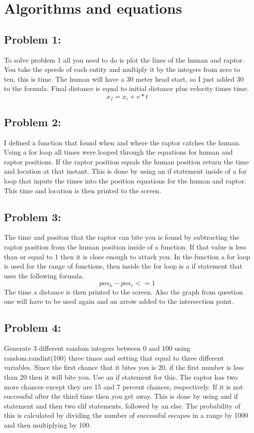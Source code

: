 \documentclass[twocolumn]{revtex4}
\begin{document}
\section{Algorithms and equations} 

\subsection{Problem 1:}
To solve problem 1 all you need to do is plot the lines of the human and raptor. You take the speeds of each entity and multiply it by the integers from zero to ten, this is time. The human will have a 30 meter head start, so I just added 30 to the formula. Final distance is equal to initial distance plus velocity times time.
	$${x_f} = {x_i} + v*t$$
	
	
	
\subsection{Problem 2:} I defined a function that found when and where the raptor catches the human. Using a for loop all times were looped through the equations for human and raptor positions. If the raptor position equals the human position return the time and location at that instant. This is done by using an if statement inside of a for loop that inputs the times into the position equations for the human and raptor. This time and location is then printed to the screen.

\subsection{Problem 3:} The time and positon that the raptor can bite you is found by subtracting the raptor position from the human position inside of a function. If that value is less than or equal to 1 then it is close enough to attack you. In the function a for loop is used for the range of functions, then inside the for loop is a if statement that uses the following formula.
$$ pos_h - pos_r <= 1$$
The time a distance is then printed to the screen. Also the graph from question one will have to be used again and an arrow added to the intersection point.

\subsection{Problem 4:} Generate 3 different random integers between 0 and 100 using random.randint(100) three times and setting that equal to three different variables. Since the first chance that it bites you is 20, if the first number is less than 20 then it will bite you. Use an if statement for this. The raptor has two more chances except they are 15 and 7 percent chances, respectively. If it is not successful after the third time then you get away. This is done by using and if statement and then two elif statements, followed by an else. The probability of this is calculated by dividing the number of successful escapes in a range by 1000 and then multiplying by 100.
\end{document}

